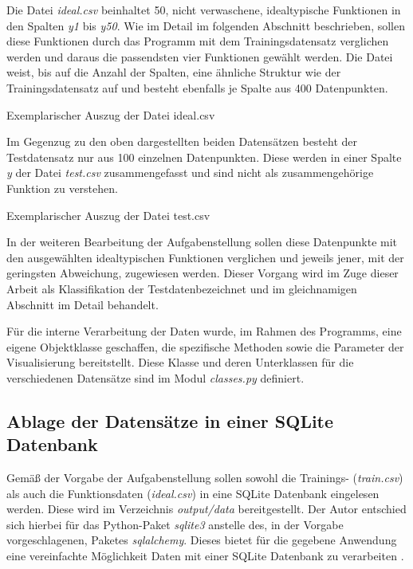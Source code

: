 Die Datei \emph{ideal.csv} beinhaltet 50, nicht \glqq verwaschene\grqq , idealtypische Funktionen in den Spalten \emph{y1} bis \emph{y50}. Wie im Detail im folgenden Abschnitt beschrieben, sollen diese Funktionen durch das Programm mit dem Trainingsdatensatz verglichen werden und daraus die passendsten vier Funktionen gewählt werden. Die Datei weist, bis auf die Anzahl der Spalten, eine ähnliche Struktur wie der Trainingsdatensatz auf und besteht ebenfalls je Spalte aus 400 Datenpunkten. 

\begin{table}[H]
\small
\centering
{}
\caption{Exemplarischer Auszug der Datei ideal.csv}
\label{tab:ideal.csv}
\end{table} 

Im Gegenzug zu den oben dargestellten beiden Datensätzen besteht der Testdatensatz nur aus 100 einzelnen Datenpunkten. Diese werden in einer Spalte \emph{y} der Datei \emph{test.csv} zusammengefasst und sind nicht als zusammengehörige Funktion zu verstehen. 

\begin{table}[H]
\small
\centering
{}
\caption{Exemplarischer Auszug der Datei test.csv}
\label{tab:test.csv}
\end{table} 

In der weiteren Bearbeitung der Aufgabenstellung sollen diese Datenpunkte mit den ausgewählten idealtypischen Funktionen verglichen und jeweils jener, mit der geringsten Abweichung, zugewiesen werden. Dieser Vorgang wird im Zuge dieser Arbeit als \glqq Klassifikation der Testdaten\grqq bezeichnet und im gleichnamigen Abschnitt im Detail behandelt.

Für die interne Verarbeitung der Daten wurde, im Rahmen des Programms, eine eigene Objektklasse geschaffen, die spezifische Methoden sowie die Parameter der Visualisierung bereitstellt. Diese Klasse und deren Unterklassen für die verschiedenen Datensätze sind im Modul \emph{classes.py} definiert.

\subsection{Ablage der Datensätze in einer SQLite Datenbank}

Gemäß der Vorgabe der Aufgabenstellung sollen sowohl die Trainings- (\emph{train.csv}) als auch die Funktionsdaten (\emph{ideal.csv}) in eine SQLite Datenbank eingelesen werden. Diese wird im Verzeichnis \emph{output/data} bereitgestellt. Der Autor entschied sich hierbei für das Python-Paket \emph{sqlite3} anstelle des, in der Vorgabe vorgeschlagenen, Paketes \emph{sqlalchemy}. Dieses bietet für die gegebene Anwendung eine vereinfachte Möglichkeit Daten mit einer SQLite Datenbank zu verarbeiten \citep{gosset_accessing_2017}.

